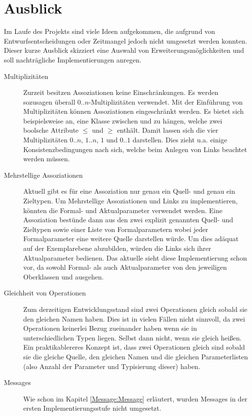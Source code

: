 \section{Ausblick}
Im Laufe des Projekts sind viele Ideen aufgekommen, die aufgrund von Entwurfsentscheidungen oder Zeitmangel 
jedoch nicht umgesetzt werden konnten. Dieser kurze Ausblick skizziert eine Auswahl von Erweiterungsmöglichkeiten und 
soll nachträgliche Implementierungen anregen.

\begin{description}
  \item[Multiplizitäten] Zurzeit besitzen Assoziationen keine Einschränkungen. 
Es werden sozusagen überall $0..n$-Multiplizitäten verwendet. 
Mit der Einführung von Multiplizitäten können Assoziationen eingeschränkt werden.
Es bietet sich beispielsweise an, eine Klasse  zwischen  und  zu hängen,
welche zwei boolsche Attribute $\leq$ und $\geq$ enthält. 
Damit lassen sich die vier Multiplizitäten $0..n$, $1..n$, $1$ und $0..1$ darstellen.
Dies zieht u.a. einige Konsistenzbedingungen nach sich, welche beim Anlegen von Links beachtet werden müssen. 
  \item[Mehrstellige Assoziationen] Aktuell gibt es für eine Assoziation nur genau ein Quell- und genau ein Zieltypen. 
  Um Mehrstellige Assoziationen und Links zu implementieren, könnten die Formal- und Aktualparameter verwendet werden. 
  Eine Assoziation bestünde dann aus den zwei explizit genannten Quell- und Zieltypen sowie einer Liste von Formalparametern 
  wobei jeder Formalparameter eine weitere Quelle darstellen würde. Um dies adäquat auf der Exemplarebene abzubilden, 
  würden die Links sich ihrer Aktualparameter bedienen. Das aktuelle \MM sieht diese Implementierung schon vor, da sowohl 
  Formal- als auch Aktualparameter von den jeweiligen Oberklassen  und  ausgehen.
  \item[Gleichheit von Operationen] Zum derzeitigen Entwicklungsstand sind zwei Operationen gleich sobald sie den gleichen Namen haben. Dies ist in vielen Fällen nicht
  sinnvoll, da zwei Operationen keinerlei Bezug zueinander haben wenn sie in unterschiedlichen Typen liegen. Selbst dann nicht, wenn sie gleich heißen. 
  Ein praktikablereres Konzept ist, dass zwei Operationen gleich sind sobald sie die gleiche Quelle, den gleichen Namen und die gleichen Parameterlisten (also Anzahl der Parameter und Typisierung dieser) haben. 
  \item[Messages] Wie schon im Kapitel \ref{Message:Message} erläutert, wurden Messages in der ersten Implementierungsstufe nicht umgesetzt. 

\end{description}

